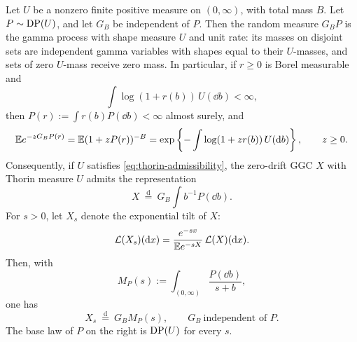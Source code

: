 \begin{lemma}
\label{lem:gamma-dirichlet}
Let \(U\) be a nonzero finite positive measure on \((0,\infty)\), with total mass \(B\).
Let \(P\sim\operatorname{DP}(U)\), and let \(G_B\) be independent of \(P\).
Then the random measure \(G_BP\) is the gamma process with shape measure \(U\) and unit rate: its masses on disjoint sets are independent gamma variables with shapes equal to their \(U\)-masses, and sets of zero \(U\)-mass receive zero mass.
In particular, if \(r\ge0\) is Borel measurable and
\[
  \int\log(1+r(b))\,U(\dd b)<\infty,
\]
then \(P(r):=\int r(b)P(\dd b)<\infty\) almost surely, and
\begin{equation}\label{eq:markov-krein}
  \mathbb E e^{-zG_BP(r)}
  =\mathbb E(1+zP(r))^{-B}
  =\exp\left\{-\int\log(1+zr(b))\,U(\mathop{}\!\mathrm d b)\right\},
  \qquad z\ge0.
\end{equation}
Consequently, if \(U\) satisfies \eqref{eq:thorin-admissibility}, the zero-drift GGC \(X\) with Thorin measure \(U\) admits the representation
\begin{equation}\label{eq:gamma-dirichlet-untilted}
  X\ \overset{\mathrm d}=\ G_B\int b^{-1}P(\dd b).
\end{equation}
For \(s>0\), let \(X_s\) denote the exponential tilt of \(X\):
\[
  \mathcal L(X_s)(\mathop{}\!\mathrm d x)
  =\frac{e^{-sx}}{\mathbb E e^{-sX}}\,\mathcal L(X)(\mathop{}\!\mathrm d x).
\]
Then, with
\[
  M_P(s):=\int_{(0,\infty)}\frac{P(\dd b)}{s+b},
\]
one has
\begin{equation}\label{eq:gamma-dirichlet-tilt}
  X_s\ \overset{\mathrm d}=\ G_BM_P(s),\qquad G_B\ \text{independent of }P.
\end{equation}
The base law of \(P\) on the right is \(\operatorname{DP}(U)\) for every \(s\).
\end{lemma}

